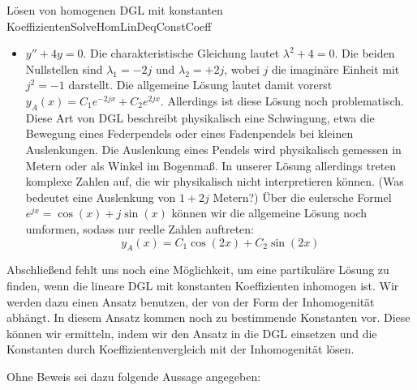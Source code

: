 \begin{example}{Lösen von homogenen DGL mit konstanten Koeffizienten}{SolveHomLinDeqConstCoeff}
\begin{itemize}
        \item $y''+4y=0$. Die charakteristische Gleichung lautet $\lambda^2+4=0$. Die beiden Nullstellen sind $\lambda_1 = - 2j$ und $\lambda_2 = + 2j$, wobei $j$ die imaginäre Einheit mit $j^2=-1$ darstellt. Die allgemeine Lösung lautet damit vorerst $y_A(x) = C_1 e^{-2jx} + C_2 e^{2jx}$. Allerdings ist diese Lösung noch problematisch. Diese Art von DGL beschreibt physikalisch eine Schwingung, etwa die Bewegung eines Federpendels oder eines Fadenpendels bei kleinen Auslenkungen. Die Auslenkung eines Pendels wird physikalisch gemessen in Metern oder als Winkel im Bogenmaß. In unserer Lösung allerdings treten komplexe Zahlen auf, die wir physikalisch nicht interpretieren können. (Was bedeutet eine Auslenkung von $1+2j$ Metern?) Über die eulersche Formel $e^{jx} = \cos(x) + j \sin(x)$ können wir die allgemeine Lösung noch umformen, sodass nur reelle Zahlen auftreten:
        $$
            y_A(x) = C_1 \cos(2x) + C_2 \sin(2x)
        $$
    \end{itemize}
\end{example}

Abschließend fehlt uns noch eine Möglichkeit, um eine partikuläre Lösung zu finden, wenn die lineare DGL mit konstanten Koeffizienten inhomogen ist. Wir werden dazu einen Ansatz benutzen, der von der Form der Inhomogenität abhängt. In diesem Ansatz kommen noch zu bestimmende Konstanten vor. Diese können wir ermitteln, indem wir den Ansatz in die DGL einsetzen und die Konstanten durch Koeffizientenvergleich mit der Inhomogenität lösen.

Ohne Beweis sei dazu folgende Aussage angegeben:

